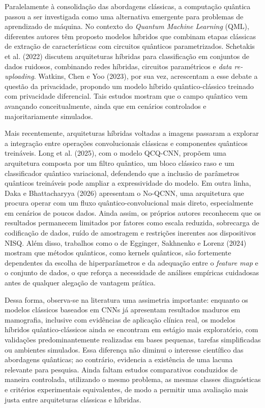 Paralelamente à consolidação das abordagens clássicas, a computação quântica passou a ser investigada como uma alternativa emergente para problemas de aprendizado de máquina. No contexto do \textit{Quantum Machine Learning} (QML), diferentes autores têm proposto modelos híbridos que combinam etapas clássicas de extração de características com circuitos quânticos parametrizados. Schetakis et al. (2022) discutem arquiteturas híbridas para classificação em conjuntos de dados ruidosos, combinando redes híbridas, circuitos paramétricos e \textit{data re-uploading}. Watkins, Chen e Yoo (2023), por sua vez, acrescentam a esse debate a questão da privacidade, propondo um modelo híbrido quântico-clássico treinado com privacidade diferencial. Tais estudos mostram que o campo quântico vem avançando conceitualmente, ainda que em cenários controlados e majoritariamente simulados.

Mais recentemente, arquiteturas híbridas voltadas a imagens passaram a explorar a integração entre operações convolucionais clássicas e componentes quânticos treináveis. Long et al. (2025), com o modelo QCQ-CNN, propõem uma arquitetura composta por um filtro quântico, um bloco clássico raso e um classificador quântico variacional, defendendo que a inclusão de parâmetros quânticos treináveis pode ampliar a expressividade do modelo. Em outra linha, Daka e Bhattacharyya (2026) apresentam o No-QCNN, uma arquitetura que procura operar com um fluxo quântico-convolucional mais direto, especialmente em cenários de poucos dados. Ainda assim, os próprios autores reconhecem que os resultados permanecem limitados por fatores como escala reduzida, sobrecarga de codificação de dados, ruído de amostragem e restrições inerentes aos dispositivos NISQ. Além disso, trabalhos como o de Egginger, Sakhnenko e Lorenz (2024) mostram que métodos quânticos, como kernels quânticos, são fortemente dependentes da escolha de hiperparâmetros e da adequação entre o \textit{feature map} e o conjunto de dados, o que reforça a necessidade de análises empíricas cuidadosas antes de qualquer alegação de vantagem prática.

Dessa forma, observa-se na literatura uma assimetria importante: enquanto os modelos clássicos baseados em CNNs já apresentam resultados maduros em mamografia, inclusive com evidências de aplicação clínica real, os modelos híbridos quântico-clássicos ainda se encontram em estágio mais exploratório, com validações predominantemente realizadas em bases pequenas, tarefas simplificadas ou ambientes simulados. Essa diferença não diminui o interesse científico das abordagens quânticas; ao contrário, evidencia a existência de uma lacuna relevante para pesquisa. Ainda faltam estudos comparativos conduzidos de maneira controlada, utilizando o mesmo problema, as mesmas classes diagnósticas e critérios experimentais equivalentes, de modo a permitir uma avaliação mais justa entre arquiteturas clássicas e híbridas.

